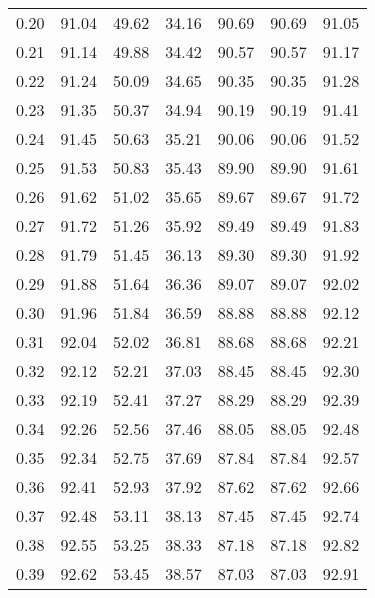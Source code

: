 \begin{tabular}{|c|c|c|c|c|c|c|}
      0.20 &     91.04 &     49.62 &      34.16 &   90.69 &      90.69 &         91.05 \\
      0.21 &     91.14 &     49.88 &      34.42 &   90.57 &      90.57 &         91.17 \\
      0.22 &     91.24 &     50.09 &      34.65 &   90.35 &      90.35 &         91.28 \\
      0.23 &     91.35 &     50.37 &      34.94 &   90.19 &      90.19 &         91.41 \\
      0.24 &     91.45 &     50.63 &      35.21 &   90.06 &      90.06 &         91.52 \\
      0.25 &     91.53 &     50.83 &      35.43 &   89.90 &      89.90 &         91.61 \\
      0.26 &     91.62 &     51.02 &      35.65 &   89.67 &      89.67 &         91.72 \\
      0.27 &     91.72 &     51.26 &      35.92 &   89.49 &      89.49 &         91.83 \\
      0.28 &     91.79 &     51.45 &      36.13 &   89.30 &      89.30 &         91.92 \\
      0.29 &     91.88 &     51.64 &      36.36 &   89.07 &      89.07 &         92.02 \\
      0.30 &     91.96 &     51.84 &      36.59 &   88.88 &      88.88 &         92.12 \\
      0.31 &     92.04 &     52.02 &      36.81 &   88.68 &      88.68 &         92.21 \\
      0.32 &     92.12 &     52.21 &      37.03 &   88.45 &      88.45 &         92.30 \\
      0.33 &     92.19 &     52.41 &      37.27 &   88.29 &      88.29 &         92.39 \\
      0.34 &     92.26 &     52.56 &      37.46 &   88.05 &      88.05 &         92.48 \\
      0.35 &     92.34 &     52.75 &      37.69 &   87.84 &      87.84 &         92.57 \\
      0.36 &     92.41 &     52.93 &      37.92 &   87.62 &      87.62 &         92.66 \\
      0.37 &     92.48 &     53.11 &      38.13 &   87.45 &      87.45 &         92.74 \\
      0.38 &     92.55 &     53.25 &      38.33 &   87.18 &      87.18 &         92.82 \\
      0.39 &     92.62 &     53.45 &      38.57 &   87.03 &      87.03 &         92.91 \\

\end{tabular}
